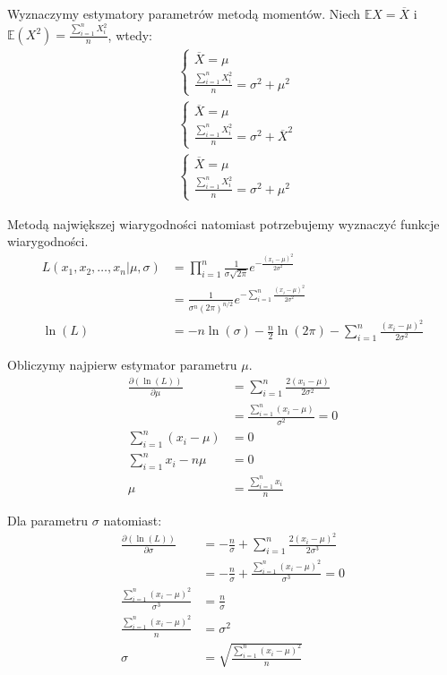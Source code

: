 \documentclass{article}
\begin{document}
Wyznaczymy estymatory parametrów metodą momentów. Niech $ \mathbb{E}X = \overline{X} $ i $\mathbb{E}(X^2) = \frac{\sum_{i=1}^n X_i^2}{n}$, wtedy:
\begin{align*}
& \left\{ 
\begin{array}{l}  \overline{X} = \mu \\  \frac{\sum_{i=1}^n X_i^2}{n} = \sigma^2 + \mu^2 \end{array} \right. \\
& \left\{ 
\begin{array}{l}  \overline{X} = \mu \\  \frac{\sum_{i=1}^n X_i^2}{n} = \sigma^2 + \overline{X}^2 \end{array} \right. \\
& \left\{ 
\begin{array}{l}  \overline{X} = \mu \\  \frac{\sum_{i=1}^n X_i^2}{n} = \sigma^2 + \mu^2 \end{array} \right. 
\end{align*}

Metodą największej wiarygodności natomiast potrzebujemy wyznaczyć funkcje wiarygodności.
\begin{align*}
L(x_1,x_2,\dots,x_n|\mu,\sigma) & = \prod_{i=1}^n \frac{1}{\sigma\sqrt{2\pi}}e^{-\frac{(x_i-\mu)^2}{2\sigma^2}} \\
& = \frac{1}{\sigma^n(2\pi)^{n/2}} e^{-\sum_{i=1}^n \frac{(x_i-\mu)^2}{2\sigma^2}} \\
\ln(L) & = -n\ln(\sigma) - \frac{n}{2}\ln(2\pi) - \sum_{i=1}^n \frac{(x_i-\mu)^2}{2\sigma^2}
\end{align*}

Obliczymy najpierw estymator parametru $\mu$.
\begin{align*}
\frac{\partial(\ln(L))}{\partial\mu} & = \sum_{i=1}^n \frac{2(x_i-\mu)}{2\sigma^2} \\
& = \frac{\sum_{i=1}^n (x_i-\mu)}{\sigma^2} = 0 \\
\sum_{i=1}^n (x_i-\mu) & = 0 \\
\sum_{i=1}^n x_i - n\mu & = 0 \\
\mu & = \frac{\sum_{i=1}^n x_i}{n}
\end{align*}

Dla parametru $\sigma$ natomiast:
\begin{align*}
\frac{\partial(\ln(L))}{\partial\sigma} & = -\frac{n}{\sigma} + \sum_{i=1}^n \frac{2(x_i-\mu)^2}{2\sigma^3} \\
& = -\frac{n}{\sigma} + \frac{\sum_{i=1}^n (x_i-\mu)^2}{\sigma^3} = 0 \\
\frac{\sum_{i=1}^n (x_i-\mu)^2}{\sigma^3} & = \frac{n}{\sigma} \\
\frac{\sum_{i=1}^n (x_i-\mu)^2}{n} & = \sigma^2 \\
\sigma & = \sqrt{\frac{\sum_{i=1}^n (x_i-\mu)^2}{n}}
\end{align*}
\end{document}
